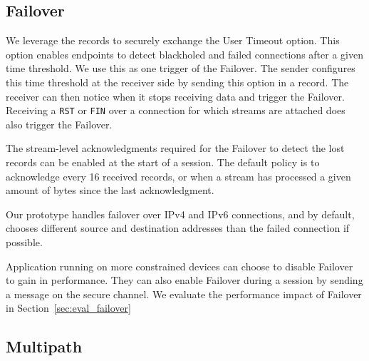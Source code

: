 
\subsection{Failover}
\label{sec:prot-migration}

We leverage the \tcpls records to securely exchange the \tcp User Timeout option.
This option enables endpoints to detect blackholed and failed \tcp connections
after a given time threshold. We use this as one trigger of the Failover. The 
sender configures this time threshold at the receiver side by sending this \tcp 
option in a \tcpls record. The receiver can then notice when it stops receiving 
data and trigger the Failover.
Receiving a \tcp \texttt{RST} or \texttt{FIN} over a \tcp connection for which
\tcpls streams are attached does also trigger the Failover.

The stream-level acknowledgments required for the Failover to detect the lost
\tcpls records can be enabled at the start of a \tcpls session. The default
policy is to acknowledge every 16 received records, or when a
stream has processed 
a given amount of 
bytes since the last acknowledgment. 

Our prototype handles failover over IPv4 and IPv6 \tcp connections, and by default, chooses different source and destination addresses than the failed \tcp connection if possible.

Application running on more constrained devices can choose to disable Failover
to gain in performance. They can also enable Failover during a \tcpls session 
by sending a message on the secure channel. 
We evaluate the performance impact of Failover in 
Section~\ref{sec:eval_failover}


\subsection{Multipath}
\label{sec:prot-multipath}

